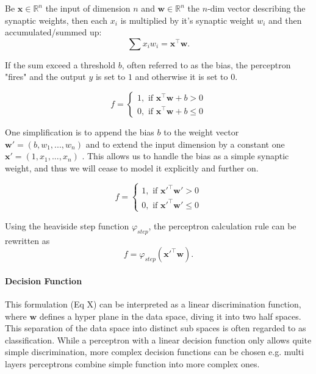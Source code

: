 Be $\textbf{x} \in \mathbb{R}^n$ the input of dimension $n$ and $\textbf{w}\in \mathbb{R}^n$ the $n$-dim vector describing the synaptic weights, then each $x_i$ is multiplied by it's synaptic weight $w_i$ and then accumulated/summed up:
\[
\sum x_i w_i = \textbf{x}^\intercal \textbf{w}.
\] 

If the sum exceed a threshold $b$, often referred to as the bias, the perceptron "fires" and the output $y$ is set to $1$ and otherwise it is set to $0$.

\[
	f = 
		\begin{cases}
			1, \text{  if  } \textbf{x}^\intercal \textbf{w} + b > 0  \\
			0, \text{  if  } \textbf{x}^\intercal \textbf{w} + b \le 0
		\end{cases}	
\]

One simplification is to append the bias $b$ to the weight vector $\textbf{w}' = (b , w_1, ... , w_n)$ and to extend the input dimension by a constant one $\textbf{x}' = (1, x_1 , ... , x_n)$ .
This allows us to handle the bias as a simple synaptic weight, and thus we will cease to  model it explicitly and further on.

\[
	f = 
		\begin{cases}
			1, \text{  if  } \textbf{x}'^\intercal \textbf{w}'> 0  \\
			0, \text{  if  } \textbf{x}'^\intercal \textbf{w}' \le 0
		\end{cases}	
\]



Using the heaviside step function $\varphi_{step}$, the perceptron calculation rule can be rewritten as 
\[
	f = \varphi_{step}(\textbf{x}'^\intercal \textbf{w}) .
\]   

\paragraph{Decision Function}

This formulation (Eq X) can be interpreted as a linear discrimination function, where $\textbf{w}$ defines a hyper plane in the data space, diving it into two half spaces. This separation of the data space into distinct sub spaces is often regarded to as classification. While a perceptron with a linear decision function only allows quite simple discrimination, more complex decision functions can be chosen e.g. multi layers perceptrons combine simple function into more complex ones. 

